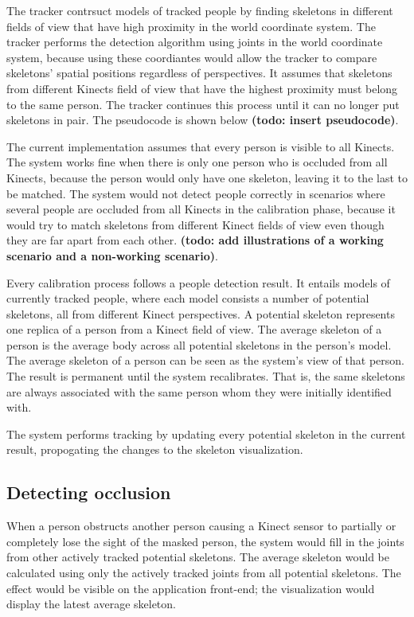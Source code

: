 \documentclass{sigchi}
\begin{document}
The tracker contrsuct models of tracked people by finding skeletons in different fields of view that have high proximity in the world coordinate system. The tracker performs the detection algorithm using joints in the world coordinate system, because using these coordiantes would allow the tracker to compare skeletons' spatial positions regardless of perspectives. It assumes that skeletons from different Kinects field of view that have the highest proximity must belong to the same person. The tracker continues this process until it can no longer put skeletons in pair. The pseudocode is shown below \textbf{(todo: insert pseudocode)}.

The current implementation assumes that every person is visible to all Kinects. The system works fine when there is only one person who is occluded from all Kinects, because the person would only have one skeleton, leaving it to the last to be matched. The system would not detect people correctly in scenarios where several people are occluded from all Kinects in the calibration phase, because it would try to match skeletons from different Kinect fields of view even though they are far apart from each other. \textbf{(todo: add illustrations of a working scenario and a non-working scenario)}.

Every calibration process follows a people detection result. It entails models of currently tracked people, where each model consists a number of potential skeletons, all from different Kinect perspectives. A potential skeleton represents one replica of a person from a Kinect field of view. The average skeleton of a person is the average body across all potential skeletons in the person's model. The average skeleton of a person can be seen as the system's view of that person. The result is permanent until the system recalibrates. That is, the same skeletons are always associated with the same person whom they were initially identified with. 

The system performs tracking by updating every potential skeleton in the current result, propogating the changes to the skeleton visualization.

\subsection{Detecting occlusion}

When a person obstructs another person causing a Kinect sensor to partially or completely lose the sight of the masked person, the system would fill in the joints from other actively tracked potential skeletons. The average skeleton would be calculated using only the actively tracked joints from all potential skeletons. The effect would be visible on the application front-end; the visualization would display the latest average skeleton.
\end{document}
